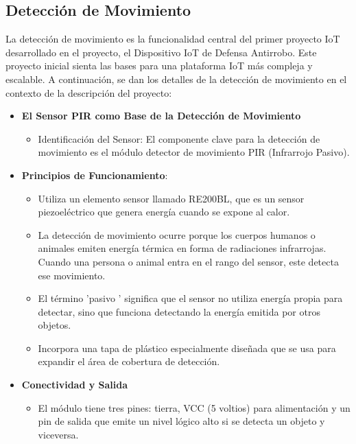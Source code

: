 \documentclass{report}
\begin{document}
\subsection{Detección de Movimiento}
La detección de movimiento es la funcionalidad central del primer proyecto IoT desarrollado en el proyecto, el Dispositivo IoT de Defensa Antirrobo. 
Este proyecto inicial sienta las bases para una plataforma IoT más compleja y escalable.
A continuación, se dan los detalles de la detección de movimiento en el contexto de la descripción del proyecto:
\begin{itemize}
    \item \textbf{El Sensor PIR como Base de la Detección de Movimiento}
    \begin{itemize}
        \item Identificación del Sensor: El componente clave para la detección de movimiento es el módulo detector de movimiento PIR (Infrarrojo Pasivo).
    \end{itemize}

    \item \textbf{Principios de Funcionamiento}:
    \begin{itemize}
        \item Utiliza un elemento sensor llamado RE200BL, que es un sensor piezoeléctrico que genera energía cuando se expone al calor.
        \item La detección de movimiento ocurre porque los cuerpos humanos o animales emiten energía térmica en forma de radiaciones infrarrojas. 
        Cuando una persona o animal entra en el rango del sensor, este detecta ese movimiento.
        \item El término  'pasivo ' significa que el sensor no utiliza energía propia para detectar, sino que funciona detectando la energía emitida por 
        otros objetos.
        \item Incorpora una tapa de plástico especialmente diseñada que se usa para expandir el área de cobertura de detección.
    \end{itemize}

    \item \textbf{Conectividad y Salida}
    \begin{itemize}
        \item El módulo tiene tres pines: tierra, VCC (5 voltios) para alimentación y un pin de salida que emite un nivel lógico alto si se detecta un 
        objeto y viceversa.
    \end{itemize}


\end{itemize}
\end{document}
